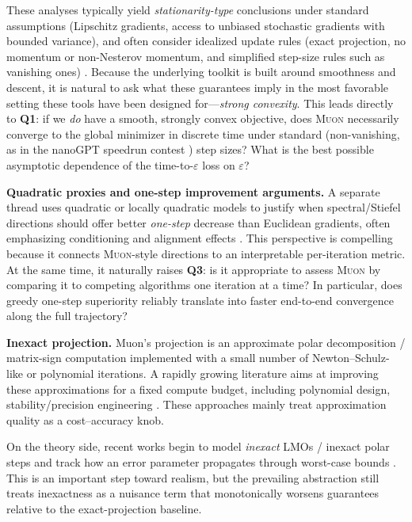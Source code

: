 \documentclass{article}
\theoremstyle{plain}
\theoremstyle{definition}
\theoremstyle{remark}
\newcommand{\Muon}{\textsc{Muon}}
\newcommand{\eps}{\varepsilon}
\begin{document}
These analyses typically yield \emph{stationarity-type} conclusions under standard assumptions (Lipschitz gradients, access to unbiased stochastic gradients with bounded variance), and often consider idealized update rules (exact projection, no momentum or non-Nesterov momentum, and simplified step-size rules such as vanishing ones)
\cite{pethick2025normconstrainedlmo,
li2025noteconvergencemuon,shen2025convergencemuon,
chen2025muonspectralnorm,kovalev2025understandinggo,
riabinin2025gluon,gruntkowska2025ef21muon,sato2025muonconvergence,nagashima2026improvedconvergenceratesmuon}.
Because the underlying toolkit is built around smoothness and descent, it is natural to ask what these guarantees imply in the most favorable setting 
these tools have been designed for---\emph{strong convexity}. 
This leads directly to \textbf{Q1}: if we \emph{do} have a smooth, strongly convex objective, does \Muon{} necessarily converge to the global minimizer in discrete time under standard (non-vanishing, as in the nanoGPT speedrun contest \cite{nanogpt24speedrun}) step sizes?
What is the best possible asymptotic dependence of the time-to-$\eps$ loss on $\eps$? 

\textbf{Quadratic proxies and one-step improvement arguments.}
A separate thread uses quadratic or locally quadratic models to justify when spectral/Stiefel directions should offer better \emph{one-step} decrease than Euclidean gradients, often emphasizing conditioning and alignment effects
\cite{davis2025whenspectral,su2025isotropiccurvature}.
This perspective is compelling because it connects \Muon{}-style directions to an interpretable per-iteration metric.
At the same time, it naturally raises \textbf{Q3}: is it appropriate to assess \Muon{} by comparing it to competing algorithms one iteration at a time?
In particular, does greedy one-step superiority reliably translate into faster end-to-end convergence along the full trajectory? 

\textbf{Inexact projection.}
Muon's projection is an approximate polar decomposition / matrix-sign computation implemented with a small number of Newton--Schulz-like or polynomial iterations.
A rapidly growing literature aims at improving these approximations for a fixed compute budget, including polynomial design, stability/precision engineering 
\cite{amsel2025polarexpress,grishina2025chebyshevns,cesista2025muonoptcoeffs,lau2025polargrad,boumal2025polarpoly,kang2025psdpoly}.
These approaches mainly treat approximation quality as a cost--accuracy knob. 

On the theory side, recent works begin to model \emph{inexact} LMOs / inexact polar steps and track how an error parameter propagates through worst-case bounds
\cite{shulgin2025beyondideal,anon2025newtonschulz,lau2025polargrad}.
This is an important step toward realism, but the prevailing abstraction still treats inexactness as a nuisance term that monotonically worsens guarantees relative to the exact-projection baseline.
\end{document}

